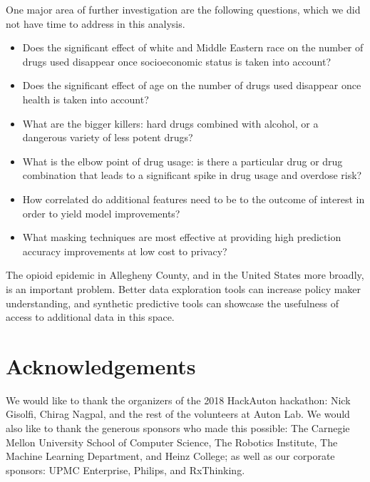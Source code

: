 \documentclass{article}
\begin{document}
One major area of further investigation are the following questions, which we did not have time to address in this analysis.
\begin{itemize}
\item Does the significant effect of white and Middle Eastern race on the number of drugs used disappear once socioeconomic status is taken into account?
\item Does the significant effect of age on the number of drugs used disappear once health is taken into account?
\item What are the bigger killers: hard drugs combined with alcohol, or a dangerous variety of less potent drugs?
\item What is the elbow point of drug usage: is there a particular drug or drug combination that leads to a significant spike in drug usage and overdose risk?
\item How correlated do additional features need to be to the outcome of interest in order to yield model improvements?
\item What masking techniques are most effective at providing high prediction accuracy improvements at low cost to privacy?
\end{itemize}

The opioid epidemic in Allegheny County, and in the United States more broadly, is an important problem. Better data exploration tools can increase policy maker understanding, and synthetic predictive tools can showcase the usefulness of access to additional data in this space.

\section*{Acknowledgements}

We would like to thank the organizers of the 2018 HackAuton hackathon: Nick Gisolfi, Chirag Nagpal, and the rest of the volunteers at Auton Lab. We would also like to thank the generous sponsors who made this possible: The Carnegie Mellon University School of Computer Science, The Robotics Institute, The Machine Learning Department, and Heinz College; as well as our corporate sponsors: UPMC Enterprise, Philips, and RxThinking.


\nocite{*}

\end{document}
